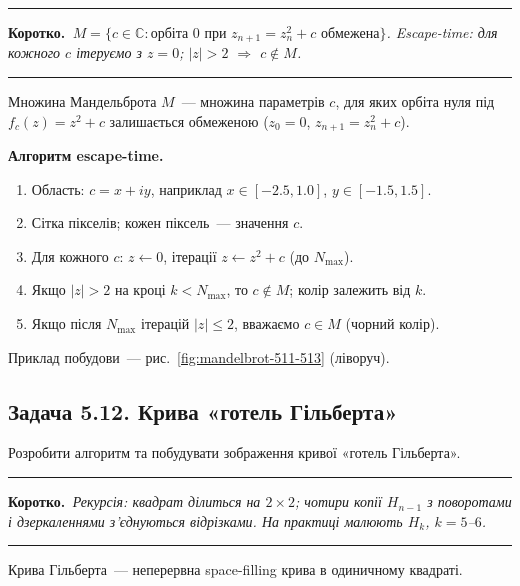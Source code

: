 \documentclass[12pt,a4paper]{article}
\newenvironment{korotko}
  {\par\medskip\noindent\begingroup\color{accent!75!black}\rule{\linewidth}{0.4pt}\par
   \noindent\textbf{Коротко.}\itshape\,}
  {\par\noindent\rule{\linewidth}{0.4pt}\endgroup\medskip}
\begin{document}
\begin{korotko}
$M=\{c\in\mathbb{C}:\text{орбіта }0\text{ при }z_{n+1}=z_n^2+c\text{ обмежена}\}$.
Escape-time: для кожного $c$ ітеруємо з $z=0$; $|z|>2$ $\Rightarrow$ $c\notin M$.
\end{korotko}

Множина Мандельброта $M$~--- множина параметрів $c$, для яких орбіта нуля під
$f_c(z)=z^2+c$ залишається обмеженою ($z_0=0$, $z_{n+1}=z_n^2+c$).

\textbf{Алгоритм escape-time.}
\begin{enumerate}[leftmargin=1.6em,itemsep=0.25em]
  \item Область: $c=x+iy$, наприклад $x\in[-2.5,1.0]$, $y\in[-1.5,1.5]$.
  \item Сітка пікселів; кожен піксель~--- значення $c$.
  \item Для кожного $c$: $z\leftarrow0$, ітерації $z\leftarrow z^2+c$ (до $N_{\max}$).
  \item Якщо $|z|>2$ на кроці $k<N_{\max}$, то $c\notin M$; колір залежить від $k$.
  \item Якщо після $N_{\max}$ ітерацій $|z|\le2$, вважаємо $c\in M$ (чорний колір).
\end{enumerate}

Приклад побудови~--- рис.~\ref{fig:mandelbrot-511-513} (ліворуч).

\subsection{Задача 5.12. Крива «готель Гільберта»}
Розробити алгоритм та побудувати зображення кривої «готель Гільберта».

\begin{korotko}
Рекурсія: квадрат ділиться на $2\times2$; чотири копії $H_{n-1}$ з поворотами
і дзеркаленнями з'єднуються відрізками. На практиці малюють $H_k$, $k=5$--$6$.
\end{korotko}

Крива Гільберта~--- неперервна space-filling крива в одиничному квадраті.
\end{document}
